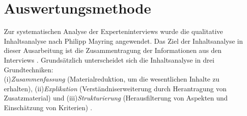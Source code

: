 \section{Auswertungsmethode}
Zur systematischen Analyse der Experteninterviews wurde die qualitative Inhaltsanalyse nach Philipp Mayring angewendet. Das Ziel der Inhaltsanalyse in dieser Ausarbeitung ist die Zusammentragung der Informationen aus den Interviews \cite{mayring1994qualitative}. Grundsätzlich unterscheidet sich die Inhaltsanalyse in drei Grundtechniken: \\(i)\emph{Zusammenfassung} (Materialreduktion, um die wesentlichen Inhalte zu erhalten), (ii)\emph{Explikation} (Verständniserweiterung durch Herantragung von Zusatzmaterial) und (iii)\emph{Strukturierung} (Herausfilterung von Aspekten und Einschätzung von Kriterien) \cite{mayring1994qualitative}.\\
